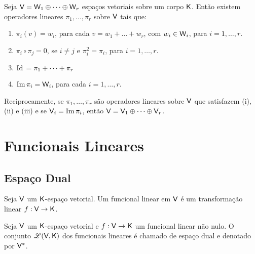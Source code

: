 \documentclass[10pt,a4paper]{book}
\begin{document}
\begin{theorem}
	Seja $\mathsf{ V } = \mathsf{ W }_1 \oplus \dots \oplus \mathsf{ W }_r$ espaços vetoriais sobre um corpo $\mathsf{ K }$. Então existem operadores lineares $\pi_1, \dots, \pi_r$ sobre $\mathsf{ V }$ tais que:
	\begin{enumerate}
		\item $\pi_i(v) = w_i$, para cada $v = w_1 + \dots + w_r$, com $w_i \in \mathsf{ W }_i$, para $i = 1, \dots, r$.
		\item $\pi_i \circ \pi_j = 0$, se $i \neq j$ e $\pi_i ^ 2 = \pi_i$, para  $i = 1, \dots, r$.
		\item $\mathrm{ Id }\, = \pi_1 + \dots + \pi_r$
		\item $\mathrm{ Im }\, \pi_i = \mathsf{ W }_i$, para cada $i = 1, \dots, r$.
	\end{enumerate}
	Reciprocamente, se $\pi_1, \dots, \pi_r$ são operadores lineares sobre $\mathsf{ V }$ que satisfazem (i), (ii) e (iii) e se $\mathsf{ V }_i = \mathrm{ Im }\, \pi_i$, então $\mathsf{ V } = \mathsf{ V }_1 \oplus \dots \oplus \mathsf{ V }_r$.
\end{theorem}




\chapter{Funcionais Lineares}




\section{Espaço Dual}

\begin{definition}
	Seja $\mathsf{ V }$ um $\mathsf{ K }$-espaço vetorial. Um funcional linear em $\mathsf{ V }$ é um transformação linear $f :\mathsf{ V } \rightarrow \mathsf{ K }$. 
\end{definition}

\begin{definition}
	Seja $\mathsf{ V }$ um $\mathsf{ K }$-espaço vetorial e $f :\mathsf{ V } \rightarrow \mathsf{ K }$  um funcional linear não nulo.  O conjunto $\mathscr{ L }(\mathsf{ V }, \mathsf{ K })$ dos funcionais lineares é chamado de espaço dual e denotado por $\mathsf{ V } ^ *$.
\end{definition}
\end{document}
